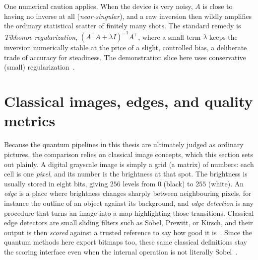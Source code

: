 One numerical caution applies. When the device is very noisy, $A$ is close to having no inverse at all (\emph{near-singular}), and a raw inversion then wildly amplifies the ordinary statistical scatter of finitely many shots. The standard remedy is \emph{Tikhonov regularization}, $(A^\top A + \lambda I)^{-1}A^\top$, where a small term $\lambda$ keeps the inversion numerically stable at the price of a slight, controlled bias, a deliberate trade of accuracy for steadiness. The demonstration slice here uses conservative (small) regularization~\cite{Mu2025GuidedImageFiltering}.

\section{Classical images, edges, and quality metrics}
\label{sec:classical-metrics}
Because the quantum pipelines in this thesis are ultimately judged as ordinary pictures, the comparison relies on classical image concepts, which this section sets out plainly. A digital grayscale image is simply a grid (a matrix) of numbers: each cell is one \emph{pixel}, and its number is the brightness at that spot. The brightness is usually stored in eight bits, giving $256$ levels from $0$ (black) to $255$ (white). An \emph{edge} is a place where brightness changes sharply between neighbouring pixels, for instance the outline of an object against its background, and \emph{edge detection} is any procedure that turns an image into a map highlighting those transitions. Classical edge detectors are small sliding filters such as Sobel, Prewitt, or Kirsch, and their output is then \emph{scored} against a trusted reference to say how good it is~\cite{Zhang2015QSobel,Zhou2019PrewittNEQR,Xu2020Kirsch}. Since the quantum methods here export bitmaps too, these same classical definitions stay the scoring interface even when the internal operation is not literally Sobel~\cite{Yao2017QHED}.

